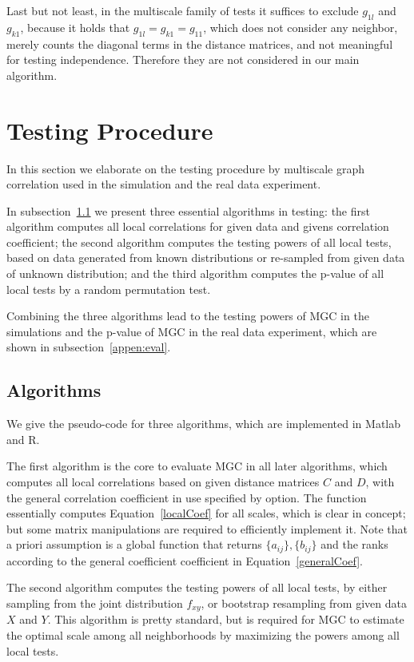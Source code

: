 \documentclass[11pt]{article}
\begin{document}
Last but not least, in the multiscale family of tests it suffices to exclude $g_{1l}$ and $g_{k1}$, because it holds that $g_{1l}=g_{k1}=g_{11}$, which does not consider any neighbor, merely counts the diagonal terms in the distance matrices, and not meaningful for testing independence. Therefore they are not considered in our main algorithm.

\section{Testing Procedure}
\label{appen:tests}

In this section we elaborate on the testing procedure by multiscale graph correlation used in the simulation and the real data experiment. 

In subsection~\ref{appen:algorithms} we present three essential algorithms in testing: the first algorithm computes all local correlations for given data and givens correlation coefficient; the second algorithm computes the testing powers of all local tests, based on data generated from known distributions or re-sampled from given data of unknown distribution; and the third algorithm computes the p-value of all local tests by a random permutation test. 

Combining the three algorithms lead to the testing powers of MGC in the simulations and the p-value of MGC in the real data experiment, which are shown in subsection~\ref{appen:eval}.

\subsection{Algorithms}
\label{appen:algorithms}
We give the pseudo-code for three algorithms, which are implemented in Matlab and R. 

The first algorithm is the core to evaluate MGC in all later algorithms, which computes all local correlations based on given distance matrices $C$ and $D$, with the general correlation coefficient in use specified by option. The function essentially computes Equation~\ref{localCoef} for all scales, which is clear in concept; but some matrix manipulations are required to efficiently implement it. Note that a priori assumption is a global function that returns $\{a_{ij}\},\{b_{ij}\}$ and the ranks according to the general coefficient coefficient in Equation~\ref{generalCoef}.

The second algorithm computes the testing powers of all local tests, by either sampling from the joint distribution $f_{xy}$, or bootstrap resampling from given data $X$ and $Y$. This algorithm is pretty standard, but is required for MGC to estimate the optimal scale among all neighborhoods by maximizing the powers among all local tests.
\end{document}
